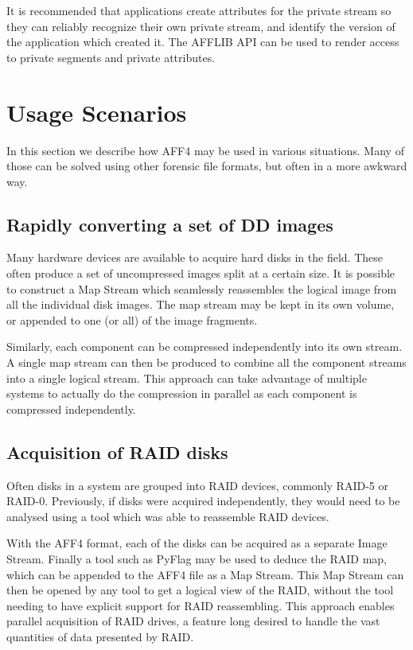 \documentclass[10pt, conference]{IEEEtran}
\begin{document}
It is recommended that applications create attributes for the private
stream so they can reliably recognize their own private stream, and
identify the version of the application which created it. The AFFLIB
API can be used to render access to private segments and private
attributes.

\section{Usage Scenarios}
In this section we describe how AFF4 may be used in various
situations. Many of those can be solved using other forensic file
formats, but often in a more awkward way.

\subsection{Rapidly converting a set of DD images}
Many hardware devices are available to acquire hard disks in the
field. These often produce a set of uncompressed images split at a
certain size. It is possible to construct a Map Stream which
seamlessly reassembles the logical image from all the individual disk
images. The map stream may be kept in its own volume, or appended to
one (or all) of the image fragments.

Similarly, each component can be compressed independently into its own
stream. A single map stream can then be produced to combine all the
component streams into a single logical stream. This approach can take
advantage of multiple systems to actually do the compression in
parallel as each component is compressed independently.

\subsection{Acquisition of RAID disks}
Often disks in a system are grouped into RAID devices, commonly RAID-5
or RAID-0. Previously, if disks were acquired independently, they
would need to be analysed using a tool which was able to reassemble
RAID devices.

With the AFF4 format, each of the disks can be acquired as a separate
Image Stream. Finally a tool such as PyFlag \cite{pyflag_raid} may be
used to deduce the RAID map, which can be appended to the AFF4 file as
a Map Stream. This Map Stream can then be opened by any tool to get a
logical view of the RAID, without the tool needing to have explicit
support for RAID reassembling. This approach enables parallel
acquisition of RAID drives, a feature long desired to handle the vast
quantities of data presented by RAID.
\end{document}
